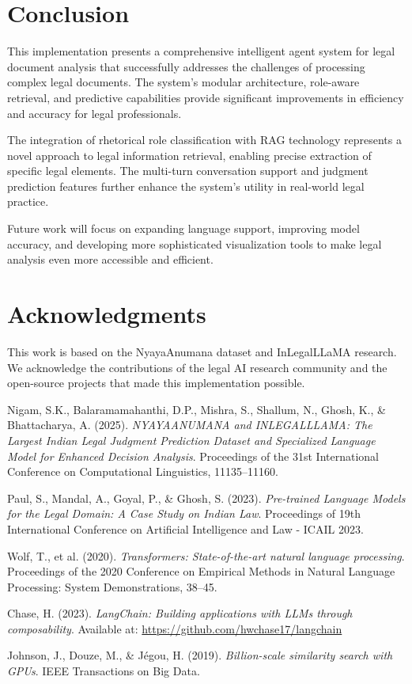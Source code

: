 \documentclass[12pt,a4paper]{article}
\begin{document}
\section{Conclusion}

This implementation presents a comprehensive intelligent agent system for legal document analysis that successfully addresses the challenges of processing complex legal documents. The system's modular architecture, role-aware retrieval, and predictive capabilities provide significant improvements in efficiency and accuracy for legal professionals.

The integration of rhetorical role classification with RAG technology represents a novel approach to legal information retrieval, enabling precise extraction of specific legal elements. The multi-turn conversation support and judgment prediction features further enhance the system's utility in real-world legal practice.

Future work will focus on expanding language support, improving model accuracy, and developing more sophisticated visualization tools to make legal analysis even more accessible and efficient.

\section*{Acknowledgments}

This work is based on the NyayaAnumana dataset and InLegalLLaMA research. We acknowledge the contributions of the legal AI research community and the open-source projects that made this implementation possible.

\begin{thebibliography}{99}

Nigam, S.K., Balaramamahanthi, D.P., Mishra, S., Shallum, N., Ghosh, K., \& Bhattacharya, A. (2025).
\textit{NYAYAANUMANA and INLEGALLLAMA: The Largest Indian Legal Judgment Prediction Dataset and Specialized Language Model for Enhanced Decision Analysis}.
Proceedings of the 31st International Conference on Computational Linguistics, 11135--11160.

Paul, S., Mandal, A., Goyal, P., \& Ghosh, S. (2023).
\textit{Pre-trained Language Models for the Legal Domain: A Case Study on Indian Law}.
Proceedings of 19th International Conference on Artificial Intelligence and Law - ICAIL 2023.

Wolf, T., et al. (2020).
\textit{Transformers: State-of-the-art natural language processing}.
Proceedings of the 2020 Conference on Empirical Methods in Natural Language Processing: System Demonstrations, 38--45.

Chase, H. (2023).
\textit{LangChain: Building applications with LLMs through composability}.
Available at: \url{https://github.com/hwchase17/langchain}

Johnson, J., Douze, M., \& Jégou, H. (2019).
\textit{Billion-scale similarity search with GPUs}.
IEEE Transactions on Big Data.

\end{thebibliography}
\end{document}
